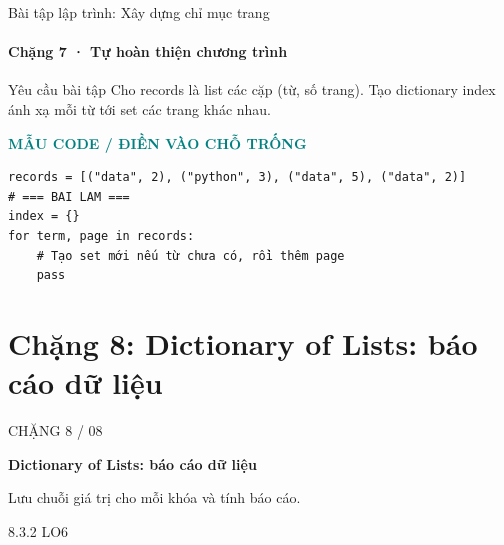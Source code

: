 \documentclass[aspectratio=169,10pt]{beamer}
\begin{document}
\begin{frame}[fragile,t]{Bài tập lập trình: Xây dựng chỉ mục trang}
\framesubtitle{Chặng 7 · Tự hoàn thiện chương trình}
\begin{block}{Yêu cầu bài tập}
Cho records là list các cặp (từ, số trang). Tạo dictionary index ánh xạ mỗi từ tới set các trang khác nhau.
\end{block}
\textcolor{teal}{\scriptsize\textbf{MẪU CODE / ĐIỀN VÀO CHỖ TRỐNG}}\par
\begin{Verbatim}[fontsize=\scriptsize,frame=single,framesep=3mm,rulecolor=\color{teal!35},breaklines=true]
records = [("data", 2), ("python", 3), ("data", 5), ("data", 2)]
# === BAI LAM ===
index = {}
for term, page in records:
    # Tạo set mới nếu từ chưa có, rồi thêm page
    pass
\end{Verbatim}
\end{frame}

\section{Chặng 8: Dictionary of Lists: báo cáo dữ liệu}

\begin{frame}[plain]
\vfill
{\color{white!65}\Large CHẶNG 8 / 08}\par\medskip
{\color{white}\fontsize{26}{30}\selectfont\bfseries Dictionary of Lists: báo cáo dữ liệu}\par\bigskip
{\color{white!80}\large Lưu chuỗi giá trị cho mỗi khóa và tính báo cáo.}\par\medskip
{\color{white!80}\normalsize 8.3.2 \hspace{1.2cm} LO6}
\vfill
\end{frame}
\end{document}
